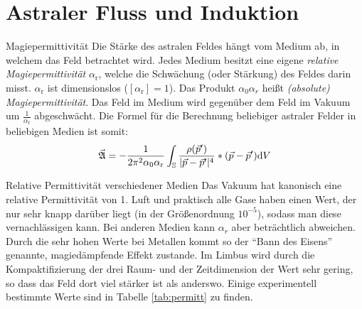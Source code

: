 \section{Astraler Fluss und Induktion}
\begin{bla}{Magiepermittivität}
Die Stärke des astralen Feldes hängt vom Medium ab, in welchem das Feld betrachtet wird. Jedes Medium besitzt eine eigene \emph{relative Magiepermittivität} $\alpha_\text{r}$, welche die Schwächung (oder Stärkung) des Feldes darin misst. $\alpha_\text{r}$ ist dimensionslos ($[\alpha_\text{r}]=1$). Das Produkt $\alpha_0\alpha_r$ heißt \emph{(absolute) Magiepermittivität}. Das Feld im Medium wird gegenüber dem Feld im Vakuum um $\frac{1}{\alpha_\text{r}}$ abgeschwächt. Die Formel für die Berechnung beliebiger astraler Felder in beliebigen Medien ist somit:
\begin{equation}
\vec{\mathfrak{A}}=-\frac{1}{2\pi^2\alpha_0\alpha_\text{r}}\int_{\mathbb{S}}\frac{\rho(\vec{p}')}{|\vec{p}-\vec{p}'|^4}*(\vec{p}-\vec{p}')\text{\rmfamily d} V
\end{equation}
\end{bla}
\begin{bla}{Relative Permittivität verschiedener Medien}
Das Vakuum hat kanonisch eine relative Permittivität von 1. Luft und praktisch alle Gase haben einen Wert, der nur sehr knapp darüber liegt (in der Größenordnung $10^{-5}$), sodass man diese vernachlässigen kann. Bei anderen Medien kann $\alpha_r$ aber beträchtlich abweichen. Durch die sehr hohen Werte bei Metallen kommt so der "`Bann des Eisens"' genannte, magiedämpfende Effekt zustande. Im Limbus wird durch die Kompaktifizierung der drei Raum- und der Zeitdimension der Wert sehr gering, so dass das Feld dort viel stärker ist als anderswo. Einige experimentell bestimmte Werte sind in Tabelle \ref{tab:permitt} zu finden.
\end{bla}
